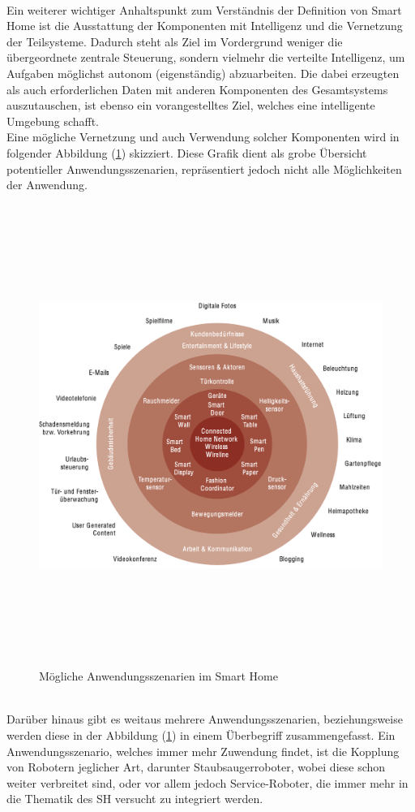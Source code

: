         \\
        Ein weiterer wichtiger Anhaltspunkt zum Verständnis der Definition von Smart Home ist die Ausstattung der Komponenten mit Intelligenz und die 
        Vernetzung der Teilsysteme. Dadurch steht als Ziel im Vordergrund weniger die übergeordnete zentrale Steuerung, sondern vielmehr die verteilte 
        Intelligenz, um Aufgaben möglichst autonom (eigenständig) abzuarbeiten. Die dabei erzeugten als auch erforderlichen Daten mit anderen 
        Komponenten des Gesamtsystems auszutauschen, ist ebenso ein vorangestelltes Ziel, welches eine intelligente Umgebung schafft. 
        \\
        Eine mögliche Vernetzung und auch Verwendung solcher Komponenten wird in folgender Abbildung (\ref{pic:szenarien-smarhome}) 
        skizziert. Diese Grafik dient als grobe Übersicht potentieller Anwendungsszenarien, repräsentiert jedoch nicht alle Möglichkeiten der Anwendung. %
        \begin{figure}[hbt!]
            \centering
            \includegraphics[width=15cm,height=15cm,keepaspectratio]{images/Anwendungsszenarien_SH.png}
            \caption{Mögliche Anwendungsszenarien im Smart Home \cite{strese.2010m}}
            \label{pic:szenarien-smarhome}
        \end{figure}
        \\
        Darüber hinaus gibt es weitaus mehrere Anwendungsszenarien, beziehungsweise werden diese in der Abbildung 
        (\ref{pic:szenarien-smarhome}) in einem Überbegriff zusammengefasst.
        Ein Anwendungsszenario, welches immer mehr Zuwendung findet, ist die Kopplung 
        von Robotern jeglicher Art, darunter Staubsaugerroboter, wobei diese schon weiter verbreitet sind, oder 
        vor allem jedoch Service-Roboter, die immer mehr in die Thematik des \acl{SH} versucht zu integriert werden. 
        
